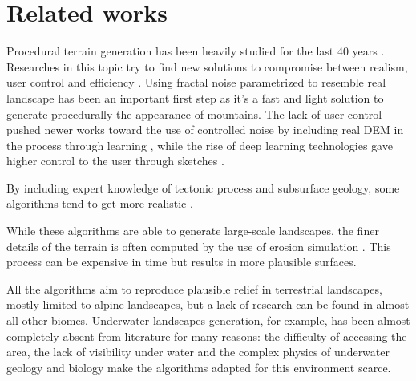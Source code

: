 


\section{Related works}
\label{sec:semantic-representation_related-works}
Procedural terrain generation has been heavily studied for the last 40 years \cite{Galin2019}. Researches in this topic try to find new solutions to compromise between realism, user control and efficiency \cite{Gain2009}. Using fractal noise parametrized to resemble real landscape has been an important first step \cite{Musgrave1989} as it's a fast and light solution to generate procedurally the appearance of mountains. The lack of user control pushed newer works toward the use of controlled noise by including real DEM in the process through learning \cite{Kapp2020, Brosz2007}, while the rise of deep learning technologies gave higher control to the user through sketches \cite{Guerin2017, Talgorn2018}.

By including expert knowledge of tectonic process and subsurface geology, some algorithms tend to get more realistic \cite{Patel2021, Cortial2019, Michel2016}. 

While these algorithms are able to generate large-scale landscapes, the finer details of the terrain is often computed by the use of erosion simulation \cite{Cordonnier2023, Schott2023, Paris2019}. This process can be expensive in time but results in more plausible surfaces.

All the algorithms aim to reproduce plausible relief in terrestrial landscapes, mostly limited to alpine landscapes, but a lack of research can be found in almost all other biomes. Underwater landscapes generation, for example, has been almost completely absent from literature for many reasons: the difficulty of accessing the area, the lack of visibility under water and the complex physics of underwater geology and biology make the algorithms adapted for this environment scarce. 


